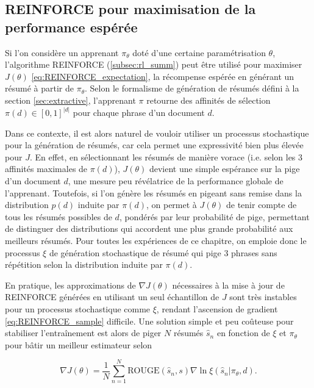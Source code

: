 \subsection{REINFORCE pour maximisation de la performance espérée}
\label{section:echantillonnage}

Si l'on considère un apprenant $\pi_\theta$ doté d'une certaine paramétrisation $\theta$,
l'algorithme REINFORCE (\ref{subsec:rl_summ}) peut être utilisé pour 
maximiser $J(\theta)$ \eqref{eq:REINFORCE_expectation}, la récompense espérée en générant
un résumé à partir de $\pi_\theta$.
Selon le formalisme de génération de résumés défini à la section \ref{sec:extractive},
l'apprenant $\pi$ retourne des affinités de sélection $\pi(d) \in [0,1]^{|d|}$
pour chaque phrase d'un document $d$.

Dans ce contexte, il est alors naturel de vouloir utiliser un processus stochastique 
pour la génération de résumés, car cela permet une expressivité 
bien plus élevée pour $J$.
En effet, en sélectionnant les résumés de manière vorace (i.e. selon 
les 3 affinités maximales de $\pi(d)$), $J(\theta)$ devient une simple 
espérance sur la pige d'un document $d$, une mesure peu révélatrice 
de la performance globale de l'apprenant.
Toutefois, si l'on génère les résumés en pigeant sans remise dans 
la distribution $p(d)$ induite par $\pi(d)$, on permet à $J(\theta)$
de tenir compte de tous les résumés possibles de $d$, pondérés par leur probabilité de pige,
permettant de distinguer des distributions qui accordent une plus grande probabilité aux
meilleurs résumés.
Pour toutes les expériences de ce chapitre, on emploie donc le processus $\xi$ de génération stochastique de résumé
qui pige 3 phrases sans répétition selon la distribution induite par $\pi(d)$.

En pratique, les approximations de $\nabla J(\theta)$ nécessaires à la 
mise à jour de REINFORCE générées en utilisant un seul
échantillon de $J$ sont très instables pour un processus stochastique comme $\xi$,
rendant l'ascension de gradient \eqref{eq:REINFORCE_sample} difficile.
Une solution simple et peu coûteuse pour stabiliser l'entraînement est alors de piger $N$
résumés $\hat{s}_n$ en fonction de $\xi$ et $\pi_\theta$ pour bâtir un meilleur estimateur selon

\begin{equation}
    \nabla J(\theta) = \frac{1}{N} \sum_{n=1}^N \text{ROUGE}(\hat{s}_n, s) \nabla \ln \xi\left(\hat{s}_n| \pi_\theta, d\right).
    \label{eq:REINFORCE_samples}
\end{equation}

